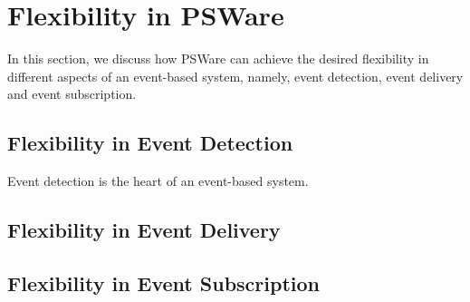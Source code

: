 \section{Flexibility in PSWare}
In this section, we discuss how PSWare can achieve the desired flexibility in different aspects of an event-based system, namely, event detection, event delivery and event subscription.

\subsection{Flexibility in Event Detection}
Event detection is the heart of an event-based system.

\subsection{Flexibility in Event Delivery}

\subsection{Flexibility in Event Subscription}